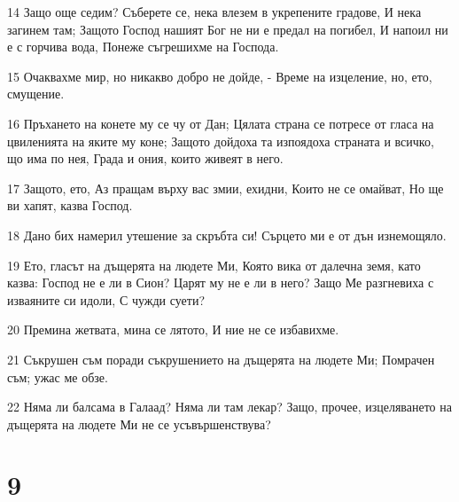 \par 14 Защо още седим? Съберете се, нека влезем в укрепените градове, И нека загинем там; Защото Господ нашият Бог не ни е предал на погибел, И напоил ни е с горчива вода, Понеже съгрешихме на Господа.
\par 15 Очаквахме мир, но никакво добро не дойде, - Време на изцеление, но, ето, смущение.
\par 16 Пръхането на конете му се чу от Дан; Цялата страна се потресе от гласа на цвиленията на яките му коне; Защото дойдоха та изпоядоха страната и всичко, що има по нея, Града и ония, които живеят в него.
\par 17 Защото, ето, Аз пращам върху вас змии, ехидни, Които не се омайват, Но ще ви хапят, казва Господ.
\par 18 Дано бих намерил утешение за скръбта си! Сърцето ми е от дън изнемощяло.
\par 19 Ето, гласът на дъщерята на людете Ми, Която вика от далечна земя, като казва: Господ не е ли в Сион? Царят му не е ли в него? Защо Ме разгневиха с изваяните си идоли, С чужди суети?
\par 20 Премина жетвата, мина се лятото, И ние не се избавихме.
\par 21 Съкрушен съм поради съкрушението на дъщерята на людете Ми; Помрачен съм; ужас ме обзе.
\par 22 Няма ли балсама в Галаад? Няма ли там лекар? Защо, прочее, изцеляването на дъщерята на людете Ми не се усъвършенствува?

\chapter{9}

